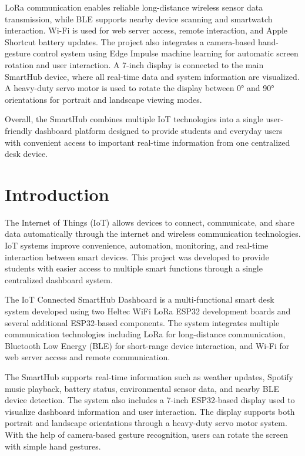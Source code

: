 \documentclass[11pt,letterpaper]{article}
\begin{document}
LoRa communication enables reliable long-distance wireless sensor data
transmission, while BLE supports nearby device scanning and smartwatch
interaction. Wi-Fi is used for web server access, remote interaction,
and Apple Shortcut battery updates.
The project also integrates a camera-based hand-gesture control
system using Edge Impulse machine learning for automatic screen
rotation and user interaction. A 7-inch display is
connected to the main SmartHub device, where all real-time data and
system information are visualized. A heavy-duty servo motor is used
to rotate the display between \ang{0} and \ang{90} orientations for
portrait and landscape viewing modes.

Overall, the SmartHub combines multiple IoT technologies into a single
user-friendly dashboard platform designed to provide students and
everyday users with convenient access to important real-time
information from one centralized desk device.

\section{Introduction}
The Internet of Things (IoT) allows devices to connect, communicate,
and share data automatically through the internet and wireless
communication technologies. IoT systems improve convenience,
automation, monitoring, and real-time interaction between smart
devices. This project was developed to provide students with easier
access to multiple smart functions through a single centralized
dashboard system.

The IoT Connected SmartHub Dashboard is a multi-functional smart desk
system developed using two Heltec WiFi LoRa ESP32 development boards
and several additional ESP32-based components.
The system integrates multiple communication technologies including
LoRa for long-distance communication, Bluetooth Low Energy (BLE) for
short-range device interaction, and Wi-Fi for web server access and
remote communication.

The SmartHub supports real-time information such as weather updates,
Spotify music playback, battery status, environmental sensor data, and
nearby BLE device detection. The system also
includes a 7-inch ESP32-based display used to visualize dashboard
information and user interaction. The
display supports both portrait and landscape orientations through a
heavy-duty servo motor system. With the help of
camera-based gesture recognition, users can rotate the screen with
simple hand gestures.
\end{document}
